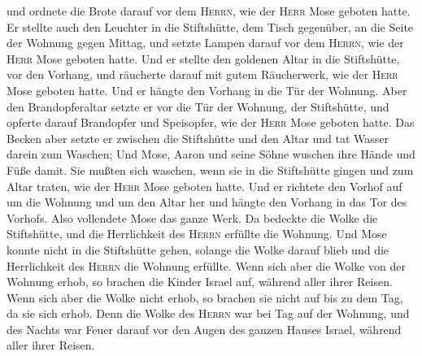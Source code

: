 und ordnete die Brote darauf vor dem \textsc{Herrn}, wie der
\textsc{Herr} Mose geboten hatte.  Er stellte auch den
Leuchter in die Stiftshütte, dem Tisch gegenüber, an die Seite der
Wohnung gegen Mittag,  und setzte Lampen darauf vor dem
\textsc{Herrn}, wie der \textsc{Herr} Mose geboten hatte.
 Und er stellte den goldenen Altar in die Stiftshütte,
vor den Vorhang,  und räucherte darauf mit gutem
Räucherwerk, wie der \textsc{Herr} Mose geboten hatte. 
Und er hängte den Vorhang in die Tür der Wohnung.  Aber
den Brandopferaltar setzte er vor die Tür der Wohnung, der Stiftshütte,
und opferte darauf Brandopfer und Speisopfer, wie der \textsc{Herr} Mose
geboten hatte.  Das Becken aber setzte er zwischen die
Stiftshütte und den Altar und tat Wasser darein zum Waschen;
 Und Mose, Aaron und seine Söhne wuschen ihre Hände und
Füße damit.  Sie mußten sich waschen, wenn sie in die
Stiftshütte gingen und zum Altar traten, wie der \textsc{Herr} Mose
geboten hatte.  Und er richtete den Vorhof auf um die
Wohnung und um den Altar her und hängte den Vorhang in das Tor des
Vorhofs. Also vollendete Mose das ganze Werk.  Da
bedeckte die Wolke die Stiftshütte, und die Herrlichkeit des
\textsc{Herrn} erfüllte die Wohnung.  Und Mose konnte
nicht in die Stiftshütte gehen, solange die Wolke darauf blieb und die
Herrlichkeit des \textsc{Herrn} die Wohnung erfüllte. 
Wenn sich aber die Wolke von der Wohnung erhob, so brachen die Kinder
Israel auf, während aller ihrer Reisen.  Wenn sich aber
die Wolke nicht erhob, so brachen sie nicht auf bis zu dem Tag, da sie
sich erhob.  Denn die Wolke des \textsc{Herrn} war bei
Tag auf der Wohnung, und des Nachts war Feuer darauf vor den Augen des
ganzen Hauses Israel, während aller ihrer Reisen.
